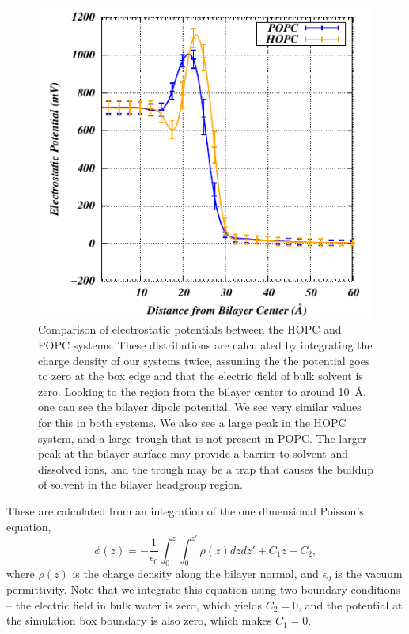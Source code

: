 \documentclass[12pt,preprint,times,openany,draft]{book}
\begin{document}
\begin{figure}
\caption{ 
Comparison of electrostatic potentials between the HOPC and POPC systems. 
These distributions are calculated by integrating the charge density of our systems twice, assuming the the potential goes 
to zero at the box edge and that the electric field of bulk solvent is zero. 
Looking to the region from the bilayer center to around 10~\AA, one can see 
the bilayer dipole potential. We see very similar values for this in 
both systems. We also see a large peak in the HOPC system, 
and a large trough that is not present in POPC. The larger peak at the bilayer surface may provide a barrier to  
solvent and dissolved ions, and the trough may be a trap that causes the buildup of solvent in the bilayer headgroup region. }
\label{fig:epot}
\includegraphics[width=\textwidth]{potential}
\end{figure}
These are calculated from an integration of the one dimensional Poisson's equation,
\begin{equation}
\label{eq:poissonint}
\phi(z)=-\frac{1}{\epsilon_0}\int_{0}^{z}\int_{0}^{z'}\rho(z) dz dz' + C_1z + C_2,
\end{equation}
where $\rho(z)$ is the charge density along the bilayer normal, and $\epsilon_0$ is the 
vacuum permittivity. Note that we integrate this equation using two boundary 
conditions -- the electric field in bulk water is zero, which yields $C_2=0$, and 
the potential at the simulation box boundary is also zero, which makes $C_1=0$.
\end{document}
